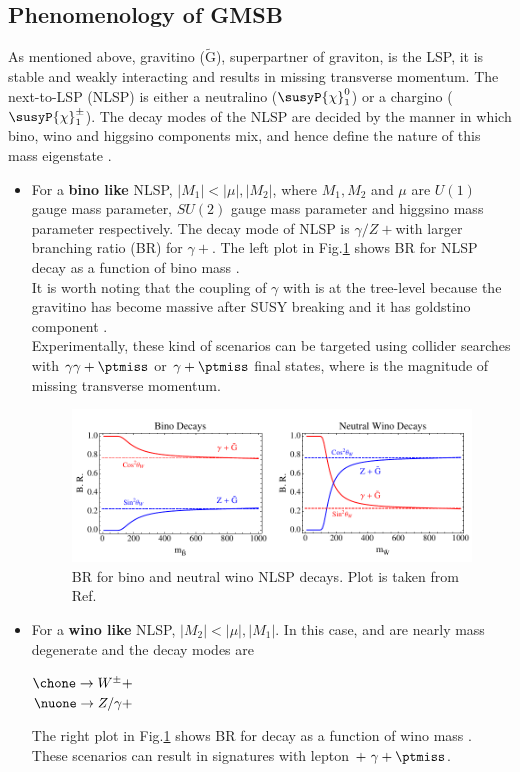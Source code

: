 \subsection{Phenomenology of GMSB}
As mentioned above, gravitino ($\tilde{\mathrm{G}}$), superpartner of graviton, is the LSP, it is stable and weakly interacting and 
results in missing transverse momentum. The next-to-LSP (NLSP) is either a neutralino ($\susyP{\chi}_{1}^{0}$) or a chargino 
($\susyP{\chi}_{1}^{\pm}$). The decay modes of the NLSP are decided by the manner in which bino, wino and higgsino components mix, and 
hence define the nature of this mass eigenstate \cite{Knapen:2016exe}.
\begin{itemize}
\item For a \textbf{bino like} NLSP, $|M_1| < |\mu|, |M_2|$, where $M_1, M_2$ and $\mu$ are $U(1)$ gauge mass parameter, $SU(2)$ gauge 
mass parameter and higgsino mass parameter respectively. The decay mode of NLSP is $\gamma/Z +$\grav with larger branching ratio (BR) for  
$\gamma +$\grav. The left plot in Fig.\ref{fig:NLSPwinoBinoBR} shows BR for NLSP decay as a function of bino mass \cite{Ruderman:2011vv}.\\
It is worth noting that the coupling of $\gamma$ with  is at the tree-level because the gravitino has become massive 
after SUSY breaking and it has goldstino component \cite{Martin:1997ns}.\\
Experimentally, these kind of scenarios can be targeted using collider searches with $\gamma\gamma+\ptmiss$ or $\gamma+\ptmiss$ final 
states, where \ptmiss is the magnitude of missing transverse momentum.

\begin{figure}[h!]
\centering
\includegraphics[width=0.8\linewidth]{../Figures/Chap1/NLSPwinoBinoBR}
\caption[BR for bino and neutral wino NLSP decays]{BR for bino and neutral wino NLSP decays. Plot is taken from Ref.\cite{Ruderman:2011vv}}
\label{fig:NLSPwinoBinoBR}
\end{figure}

\item For a \textbf{wino like} NLSP, $|M_2| < |\mu|, |M_1|$. In this case, \nuone and \chone are nearly mass degenerate and the decay 
modes are
\begin{center}
$\chone \rightarrow W^\pm + $\grav \\%
$\nuone \rightarrow Z/\gamma + $\grav
\end{center}
The right plot in Fig.\ref{fig:NLSPwinoBinoBR} shows BR for \nuone decay as a function of wino mass \cite{Ruderman:2011vv}. These 
scenarios can result in signatures with lepton $+\ \gamma+\ptmiss$.


\end{itemize}
